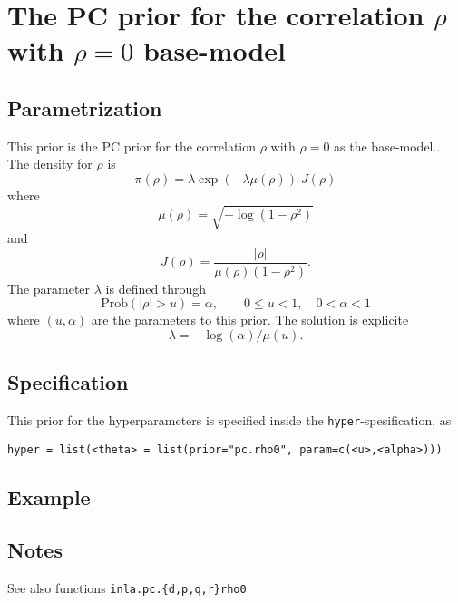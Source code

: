 \documentclass[a4paper,11pt]{article}
\begin{document}
\section*{The PC prior for the correlation $\rho$ with $\rho=0$ base-model}

\subsection*{Parametrization}
This prior is the PC prior for the correlation $\rho$ with $\rho=0$ as
the base-model.. The density for $\rho$ is
\begin{displaymath}
    \pi(\rho) = \lambda \exp(-\lambda \mu(\rho)) \; J(\rho)
\end{displaymath}
where
\begin{displaymath}
    \mu(\rho) = \sqrt{-\log(1-\rho^{2})}
\end{displaymath}
and
\begin{displaymath}
    J(\rho) = \frac{|\rho|}{\mu(\rho) (1-\rho^{2})}.
\end{displaymath}
The parameter $\lambda$ is defined through
\begin{displaymath}
    \text{Prob}( |\rho| > u) = \alpha, \qquad 0 \le u < 1, \quad 0<\alpha<1
\end{displaymath}
where $(u, \alpha{})$ are the parameters to this prior. The solution
is explicite 
\begin{displaymath}
    \lambda = -\log(\alpha)/\mu(u).
\end{displaymath}

\subsection*{Specification}
This prior for the hyperparameters is specified inside the
\texttt{hyper}-spesification, as
\begin{center}
    \texttt{hyper = list(<theta> = list(prior="pc.rho0", param=c(<u>,<alpha>)))}
\end{center}

\subsection*{Example}

\subsection*{Notes}
See also functions \texttt{inla.pc.\{d,p,q,r\}rho0}
\end{document}
